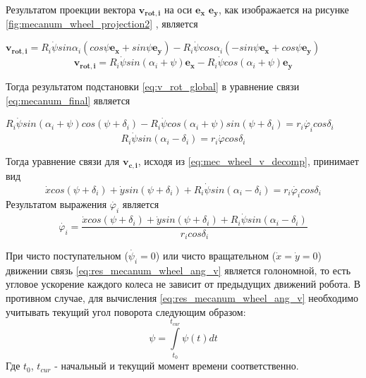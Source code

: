 \documentclass[oneside,final,14pt]{extreport}
\newcommand{\bs}{\boldsymbol}
\begin{document}
Результатом проекции вектора $\bs{v_{rot,i}}$ на оси $\bs{e_{x}}$ $\bs{e_{y}}$, как изображается на рисунке \ref{fig:mecanum_wheel_projection2} , является

$
\bs{v_{rot,i}}
=
R_{i}
\dot{\psi}
sin\alpha_{i}
(
cos\psi \bs{e_{x}}
+
sin\psi \bs{e_{y}}
)
-
R_{i}
\dot{\psi}
cos\alpha_{i}
(
-sin\psi \bs{e_{x}}
+
cos\psi \bs{e_{y}}
)
$
\begin{equation}
\label{eq:v_rot_global}
\bs{v_{rot,i}}
=
R_{i}
\dot{\psi}
sin(\alpha_{i} + \psi)
\bs{e_{x}}
-
R_{i}
\dot{\psi}
cos(\alpha_{i} + \psi)
\bs{e_{y}}
\end{equation}

\begin{figure}[H]
\end{figure}

Тогда результатом подстановки \ref{eq:v_rot_global} в уравнение связи \ref{eq:mecanum_final} является

$
R_{i}
\dot{\psi}
sin(\alpha_{i} + \psi)
cos(\psi + \delta_{i})
-
R_{i}
\dot{\psi}
cos(\alpha_{i} + \psi)
sin(\psi + \delta_{i})
=
r_{i}\dot{\varphi_{i}}
cos\delta_{i}
$
\begin{equation}
R_{i}
\dot{\psi}
sin(\alpha_{i} - \delta_{i})
=
r_{i}
\dot{\varphi}
cos\delta_{i}
\end{equation}

Тогда уравнение связи для $\bs{v_{c,i}}$, исходя из \ref{eq:mec_wheel_v_decomp}, принимает вид
\begin{equation}
\label{eq:res_mecanum_wheel_car}
\dot{x}
cos(\psi+\delta_{i})
+
\dot{y}
sin(\psi+\delta_{i})
+
R_{i}
\dot{\psi}
sin(\alpha_{i}-\delta_{i})
=
r_{i}\dot{\varphi_{i}}
cos\delta_{i}
\end{equation}
Результатом выражения $\dot{\varphi_{i}}$ является
\begin{equation}
\label{eq:res_mecanum_wheel_ang_v}
\dot{\varphi_{i}}
=
\frac{
  \dot{x}
  cos(\psi+\delta_{i})
  +
  \dot{y}
  sin(\psi+\delta_{i})
  +
  R_{i}
  \dot{\psi}
  sin(\alpha_{i}-\delta_{i})
}
{
  r_{i}cos\delta_{i}
}
\end{equation}

При чисто поступательном ($\dot{\psi_{i}} = 0$) или чисто вращательном ($\dot{x}=\dot{y}=0$) движении связь \ref{eq:res_mecanum_wheel_ang_v} является голономной, то есть угловое ускорение каждого колеса не зависит от предыдущих движений робота. В противном случае, для вычисления \ref{eq:res_mecanum_wheel_ang_v} необходимо учитывать текущий угол поворота следующим образом:
\begin{equation}
\psi
=
\int\limits_{t_{0}}^{t_{cur}} \psi(t) dt
\end{equation}
Где $t_{0}$, $t_{cur}$ - начальный и текущий момент времени соответственно.
\end{document}
